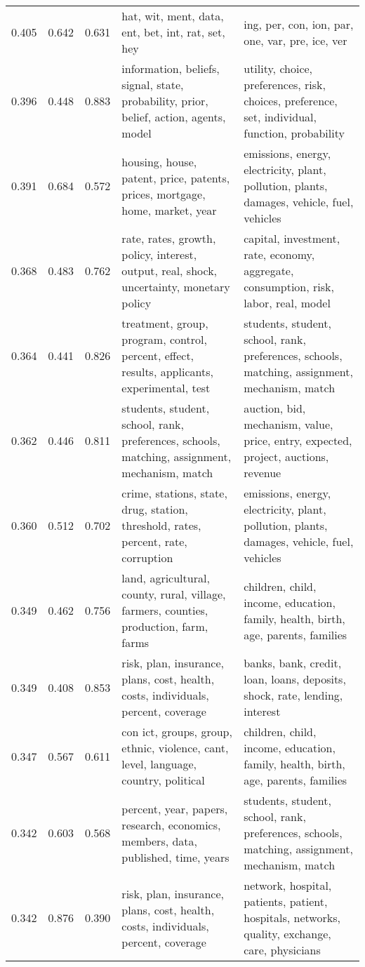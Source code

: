 \begin{tabular}{cccp{5cm}p{5cm}}
0.405 & 0.642 & 0.631 & hat, wit, ment, data, ent, bet, int, rat, set, hey & ing, per, con, ion, par, one, var, pre, ice, ver \\
0.396 & 0.448 & 0.883 & information, beliefs, signal, state, probability, prior, belief, action, agents, model & utility, choice, preferences, risk, choices, preference, set, individual, function, probability \\
0.391 & 0.684 & 0.572 & housing, house, patent, price, patents, prices, mortgage, home, market, year & emissions, energy, electricity, plant, pollution, plants, damages, vehicle, fuel, vehicles \\
0.368 & 0.483 & 0.762 & rate, rates, growth, policy, interest, output, real, shock, uncertainty, monetary policy & capital, investment, rate, economy, aggregate, consumption, risk, labor, real, model \\
0.364 & 0.441 & 0.826 & treatment, group, program, control, percent, effect, results, applicants, experimental, test & students, student, school, rank, preferences, schools, matching, assignment, mechanism, match \\
0.362 & 0.446 & 0.811 & students, student, school, rank, preferences, schools, matching, assignment, mechanism, match & auction, bid, mechanism, value, price, entry, expected, project, auctions, revenue \\
0.360 & 0.512 & 0.702 & crime, stations, state, drug, station, threshold, rates, percent, rate, corruption & emissions, energy, electricity, plant, pollution, plants, damages, vehicle, fuel, vehicles \\
0.349 & 0.462 & 0.756 & land, agricultural, county, rural, village, farmers, counties, production, farm, farms & children, child, income, education, family, health, birth, age, parents, families \\
0.349 & 0.408 & 0.853 & risk, plan, insurance, plans, cost, health, costs, individuals, percent, coverage & banks, bank, credit, loan, loans, deposits, shock, rate, lending, interest \\
0.347 & 0.567 & 0.611 & con ict, groups, group, ethnic, violence, cant, level, language, country, political & children, child, income, education, family, health, birth, age, parents, families \\
0.342 & 0.603 & 0.568 & percent, year, papers, research, economics, members, data, published, time, years & students, student, school, rank, preferences, schools, matching, assignment, mechanism, match \\
0.342 & 0.876 & 0.390 & risk, plan, insurance, plans, cost, health, costs, individuals, percent, coverage & network, hospital, patients, patient, hospitals, networks, quality, exchange, care, physicians \\

\end{tabular}
